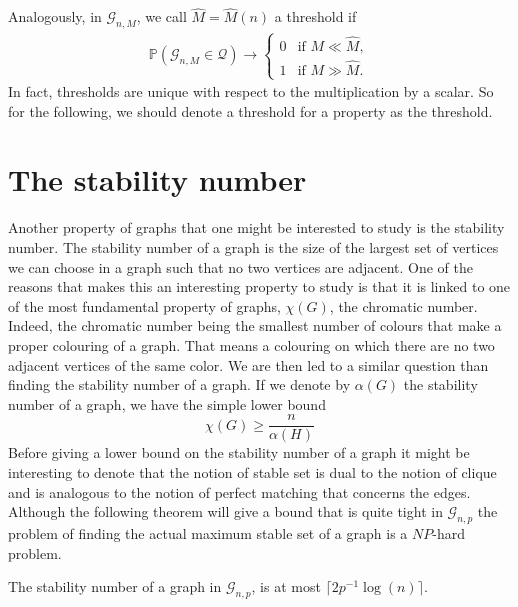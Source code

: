 Analogously, in $\mathcal{G}_{n, M}$, we call $\hat{M} = \hat{M}(n)$ a threshold if
\begin{align}
	\mathbb{P}(\mathcal{G}_{n,M} \in \mathcal{Q}) \rightarrow \left\{\begin{array}{rl}
										0 & \text{if } M \ll \hat{M},\\
										1 & \text{if } M \gg \hat{M}.
									 \end{array}
									\right.
\end{align}
In fact, thresholds are unique with respect to the multiplication by a scalar. So for the following, we should denote a threshold for a property as the threshold.


\section{The stability number}
Another property of graphs that one might be interested to study is the stability number. The stability number of a graph is the size of the largest set of vertices we can choose in a graph such that no two vertices are adjacent. 
One of the reasons that makes this an interesting property to study is that it is linked to one of the most fundamental property of graphs, $\chi (G)$, the chromatic number. Indeed, the chromatic number being the smallest number of colours that make a proper colouring of a graph. 
That means a colouring on which there are no two adjacent vertices of the same color. 
We are then led to a similar question than finding the stability number of a graph.
If we denote by $\alpha(G)$ the stability number of a graph, we have the simple lower bound
\begin{equation}
	\chi(G) \geq \frac{n}{\alpha(H)}
\end{equation}
Before giving a lower bound on the stability number of a graph it might be interesting to denote that the notion of stable set is dual to the notion of clique and is analogous to the notion of perfect matching that concerns the edges.
Although the following theorem will give a bound that is quite tight in $\mathcal{G}_{n, p}$ the problem of finding the actual maximum stable set of a graph is a $NP$-hard problem.
\begin{theorem}
	The stability number of a graph in $\mathcal{G}_{n, p}$, is at most $\lceil 2p^{-1}\log(n)\rceil$.
\end{theorem}
